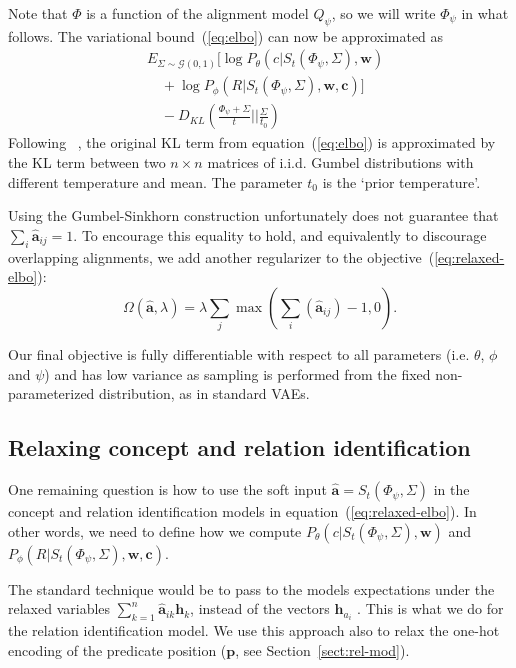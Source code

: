 \documentclass[11pt,a4paper]{article}
\begin{document}
Note that $\Phi$ is a function of  the alignment model $Q_{\psi}$, so we will write $\Phi_\psi$ in what follows. The variational  bound~(\ref{eq:elbo}) can now be approximated as
\begin{align}
\nonumber
&E_{\Sigma \sim \mathcal{G}(0,1)}[\log P_\theta(c | S_t(\Phi_\psi, \Sigma), \mathbf{w}) \\
\nonumber
& \quad + \log P_\phi(R | S_t(\Phi_\psi, \Sigma), \mathbf{w}, \mathbf{c})
]\\
\label{eq:relaxed-elbo} 
  & \quad - D_{KL}(  \frac {\Phi_{\psi} + \Sigma} { t    } || 
  \frac{\Sigma}{t_0}
  )
\end{align}
Following ~, the original KL term from equation~(\ref{eq:elbo}) is approximated by the KL term between two $n \times n$ matrices of i.i.d. Gumbel distributions with different temperature and mean. The parameter $t_0$ is the `prior temperature'. 

Using the Gumbel-Sinkhorn construction unfortunately does not guarantee
that $\sum_i \hat{\mathbf{a}}_{ij} = 1$.
To encourage this equality to hold, and equivalently to discourage overlapping alignments, we add another regularizer to the objective~(\ref{eq:relaxed-elbo}): 
\begin{equation}
\label{eq:sink-reg}
\Omega(\hat{\mathbf{a}},\lambda)= \lambda\sum_j \max(\sum_i (\hat{\mathbf{a}}_{ij})-1,0).
\end{equation}


Our final objective is fully differentiable with respect to all parameters (i.e. $\theta$, $\phi$ and $\psi$) and has low variance as sampling is performed from the fixed non-parameterized distribution, as in standard VAEs.

\subsection{Relaxing concept and relation identification}\label{sec:relax}

One remaining question is how to use the soft input $\hat{\mathbf{a}} = S_t(\Phi_\psi, \Sigma)$ in the concept and relation identification models in equation~(\ref{eq:relaxed-elbo}). In other words, we need to define how we  compute $P_\theta(c | S_t(\Phi_\psi, \Sigma), \mathbf{w})$ and $P_\phi(R | S_t(\Phi_\psi, \Sigma), \mathbf{w}, \mathbf{c})$. 

The standard technique would be to pass to the models expectations under the relaxed variables $\sum_{k=1}^{n}{\hat{\mathbf{a}}_{ik} \mathbf{h}_k}$, instead of the vectors $\mathbf{h}_{a_i}$ \cite{maddison2016concrete,jang2016categorical}. This is what we do for the relation identification model. We use this approach also 
to relax the one-hot encoding of the predicate position ($\mathbf{p}$, see Section~\ref{sect:rel-mod}).
\end{document}
